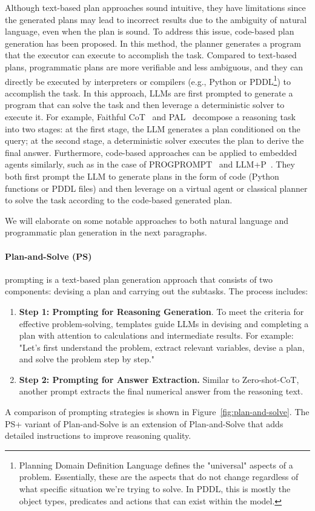 Although text-based plan approaches sound intuitive, they have limitations since the generated plans may lead to incorrect results due to the ambiguity of natural language, even when the plan is sound.
To address this issue, code-based plan generation has been proposed. In this method, the planner generates a program that the executor can execute to accomplish the task.
Compared to text-based plans, programmatic plans are more verifiable and less ambiguous, and they can directly be executed by interpreters or compilers (e.g., Python or PDDL\footnote{Planning Domain Definition Language defines the "universal" aspects of a problem. Essentially, these are the aspects that do not change regardless of what specific situation we’re trying to solve. In PDDL, this is mostly the object types, predicates and actions that can exist within the model.}) to accomplish the task.
In this approach, LLMs are first prompted to generate a program that can solve the task and then leverage a deterministic solver to execute it.
For example, Faithful CoT~\cite{lyu2023faithful} and PAL~\cite{gao2022pal} decompose a reasoning task into two stages: at the first stage, the LLM generates a plan conditioned on the query; at the second stage, a deterministic solver executes the plan to derive the final answer.
Furthermore, code-based approaches can be applied to embedded agents similarly, such as in the case of PROGPROMPT~\cite{singh2022progprompt} and LLM+P~\cite{liu2023llmp}.
They both first prompt the LLM to generate plans in the form of code (Python functions or PDDL files) and then leverage on a virtual agent or classical planner to solve the task according to the code-based generated plan.

We will elaborate on some notable approaches to both natural language and programmatic plan generation in the next paragraphs.

\paragraph{Plan-and-Solve (PS)}
\label{par:plan-and-solve}

prompting is a text-based plan generation approach that consists of two components: devising a plan and carrying out the subtasks.
The process includes:
\begin{enumerate}
	\item \textbf{Step 1: Prompting for Reasoning Generation}. To meet the criteria for effective problem-solving, templates guide LLMs in devising and completing a plan with attention to calculations and intermediate results. For example: "Let's first understand the problem, extract relevant variables, devise a plan, and solve the problem step by step."
	\item \textbf{Step 2: Prompting for Answer Extraction.} Similar to Zero-shot-CoT, another prompt extracts the final numerical answer from the reasoning text.
\end{enumerate}
A comparison of prompting strategies is shown in Figure~\ref{fig:plan-and-solve}.
The PS+ variant of Plan-and-Solve is an extension of Plan-and-Solve that adds detailed instructions to improve reasoning quality.

